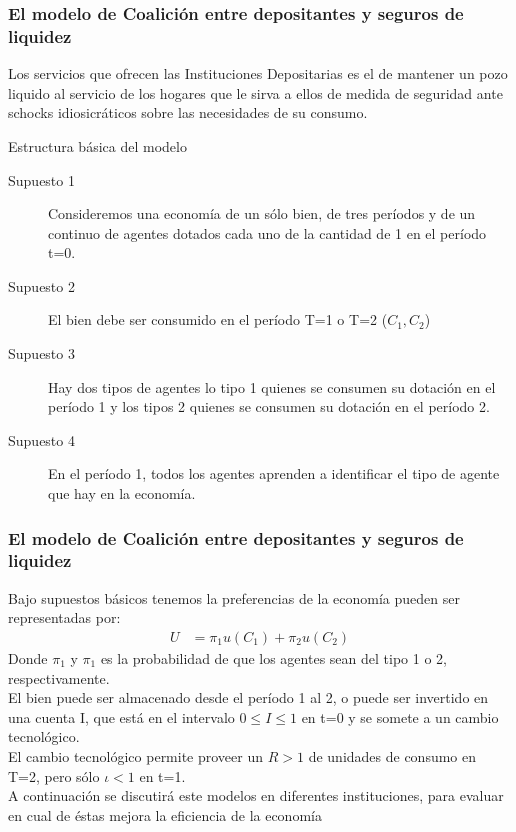 \begin{frame}
    \frametitle{{\normalsize El modelo de Coalición entre depositantes y seguros de liquidez } {}}
    
    Los servicios que ofrecen las Instituciones Depositarias es el de mantener un pozo liquido al servicio de los hogares que le sirva a ellos de medida de seguridad ante schocks idiosicráticos sobre las necesidades de su consumo.
    
     \begin{block} {Estructura básica del modelo}
        \begin{description}
            \item[Supuesto 1] Consideremos una economía de un sólo bien,  de tres períodos y de un continuo de agentes dotados cada uno de la cantidad de 1 en el período t=0.
            \item[Supuesto 2] El bien debe ser consumido en el período T=1 o T=2 ($C_{1}, C_{2} $)
            \item[Supuesto 3] Hay dos tipos de agentes lo tipo 1 quienes se consumen su dotación en el período 1 y los tipos 2 quienes se consumen su dotación en el período 2.
             \item[Supuesto 4] En el período 1, todos los agentes aprenden a identificar el tipo de agente que hay en la economía.
         \end{description}
        
    \end{block}	
    
    
    
\end{frame}

\begin{frame}
    \frametitle{{\normalsize El modelo de Coalición entre depositantes y seguros de liquidez } {}}
    
   Bajo supuestos básicos tenemos la preferencias de la economía pueden ser representadas por:
   \begin{align}
   U&=\pi_{1}u(C_{1})+\pi_{2}u(C_{2})\nonumber
   \end{align}
   Donde $\pi_{1}$ y  $\pi_{1}$ es la probabilidad de que los agentes sean del tipo 1 o 2, respectivamente.\\
   El bien puede ser almacenado desde el período 1 al 2, o puede ser invertido en una cuenta I, que está en el intervalo $0\leq I \leq 1$ en t=0 y se somete a un cambio tecnológico.\\ 
   El cambio tecnológico permite proveer un $R>1$ de unidades de consumo en T=2, pero sólo  $\iota<1$ en t=1.\\
   
   A continuación se discutirá este modelos en diferentes instituciones, para evaluar en cual de éstas mejora la eficiencia de la economía
   
\end{frame}


